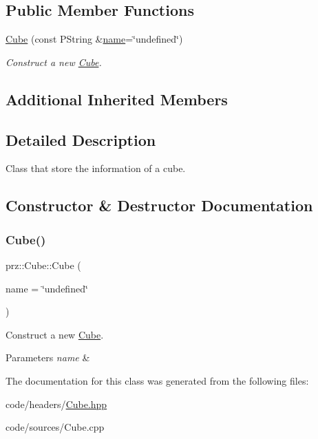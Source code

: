 \subsection*{Public Member Functions}
\begin{DoxyCompactItemize}
\item 
\mbox{\hyperlink{classprz_1_1_cube_a1b25434c8e2405d3c966ca30244b562a}{Cube}} (const P\+String \&\mbox{\hyperlink{classprz_1_1_mesh_ae2a7cec3a1cb7409ea2017cd729fe683}{name}}=\char`\"{}undefined\char`\"{})
\begin{DoxyCompactList}\small\item\em Construct a new \mbox{\hyperlink{classprz_1_1_cube}{Cube}}. \end{DoxyCompactList}\end{DoxyCompactItemize}
\subsection*{Additional Inherited Members}


\subsection{Detailed Description}
Class that store the information of a cube. 



\subsection{Constructor \& Destructor Documentation}
\mbox{\label{classprz_1_1_cube_a1b25434c8e2405d3c966ca30244b562a}} 
\subsubsection{\texorpdfstring{Cube()}{Cube()}}
{\footnotesize\ttfamily prz\+::\+Cube\+::\+Cube (\begin{DoxyParamCaption}\item[{const P\+String \&}]{name = {\ttfamily \char`\"{}undefined\char`\"{}} }\end{DoxyParamCaption})}



Construct a new \mbox{\hyperlink{classprz_1_1_cube}{Cube}}. 


\begin{DoxyParams}{Parameters}
{\em name} & \\
\hline
\end{DoxyParams}


The documentation for this class was generated from the following files\+:\begin{DoxyCompactItemize}
\item 
code/headers/\mbox{\hyperlink{_cube_8hpp}{Cube.\+hpp}}\item 
code/sources/Cube.\+cpp\end{DoxyCompactItemize}
